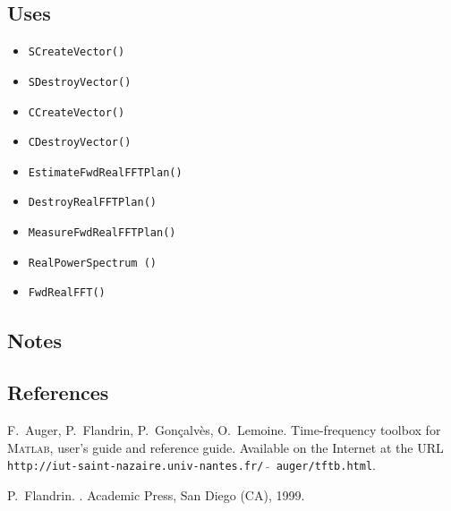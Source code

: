 \documentclass{article}
\begin{document}
\subsection{Uses}
\begin{itemize}
\item\texttt{SCreateVector()}
\item\texttt{SDestroyVector()}
\item\texttt{CCreateVector()}
\item\texttt{CDestroyVector()}
\item\texttt{EstimateFwdRealFFTPlan()}
\item\texttt{DestroyRealFFTPlan()}
\item\texttt{MeasureFwdRealFFTPlan()}
\item\texttt{RealPowerSpectrum ()}
\item\texttt{FwdRealFFT()}
\end{itemize}

\subsection{Notes}

\subsection{References}

\begin{thebibliography}{0}

F.~Auger, P.~Flandrin, P.~Gon\c{c}alv\`es, O.~Lemoine.
\newblock Time-frequency toolbox for M\textsc{atlab},
user's guide and reference guide.
\newblock Available on the Internet at the URL
\texttt{http://iut-saint-nazaire.univ-nantes.fr/ $\tilde{ }$\,auger/tftb.html}.

P.~Flandrin.
.
\newblock Academic Press, San Diego (CA), 1999.
\end{thebibliography}
\end{document}
